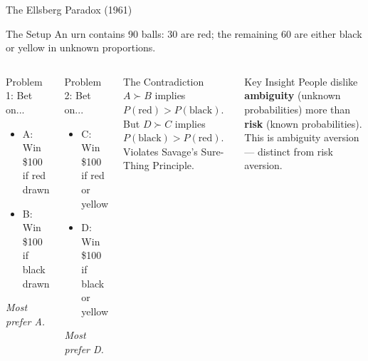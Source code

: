 \documentclass[aspectratio=169]{beamer}
\begin{document}
\begin{frame}{The Ellsberg Paradox (1961)}
\begin{block}{The Setup}
An urn contains 90 balls: 30 are \textcolor{berust}{red}; the remaining 60 are either \textcolor{beblue}{black} or \textcolor{begold}{yellow} in unknown proportions.
\end{block}
\begin{columns}
\begin{block}{Problem 1: Bet on...}
\begin{itemize}
  \item A: Win \$100 if \textcolor{berust}{red} drawn
  \item B: Win \$100 if \textcolor{beblue}{black} drawn
\end{itemize}
\textit{Most prefer A.}
\end{block}
\begin{block}{Problem 2: Bet on...}
\begin{itemize}
  \item C: Win \$100 if \textcolor{berust}{red} or \textcolor{begold}{yellow}
  \item D: Win \$100 if \textcolor{beblue}{black} or \textcolor{begold}{yellow}
\end{itemize}
\textit{Most prefer D.}
\end{block}
\begin{alertblock}{The Contradiction}
$A \succ B$ implies $P(\text{red}) > P(\text{black})$. But $D \succ C$ implies $P(\text{black}) > P(\text{red})$. \alert{Violates Savage's Sure-Thing Principle.}
\end{alertblock}
\begin{exampleblock}{Key Insight}
People dislike \textbf{ambiguity} (unknown probabilities) more than \textbf{risk} (known probabilities). This is \alert{ambiguity aversion} --- distinct from risk aversion.
\end{exampleblock}
\end{columns}
\end{frame}
\end{document}
